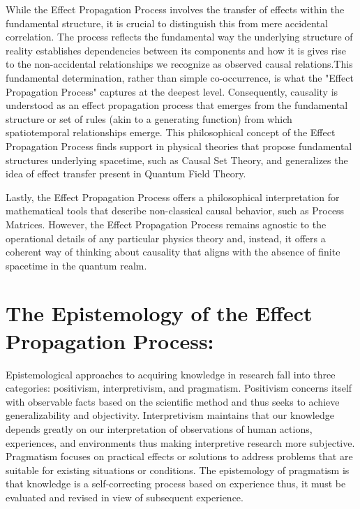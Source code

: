 \documentclass{article}
\begin{document}
While the Effect Propagation Process involves the transfer of effects within the fundamental structure, it is crucial to distinguish this from mere accidental correlation. The process reflects the fundamental way the underlying structure of reality establishes dependencies between its components and how it is gives rise to the non-accidental relationships we recognize as observed causal relations.This fundamental determination, rather than simple co-occurrence, is what the "Effect Propagation Process" captures at the deepest level.\newline
Consequently, causality is understood as an effect propagation process that emerges from the fundamental structure or set of rules (akin to a generating function) from which spatiotemporal relationships emerge. This philosophical concept of the Effect Propagation Process finds support in physical theories that propose fundamental structures underlying spacetime, such as Causal Set Theory, and generalizes the idea of effect transfer present in Quantum Field Theory.

Lastly, the Effect Propagation Process offers a philosophical interpretation for mathematical tools that describe non-classical causal behavior, such as Process Matrices. However, the Effect Propagation Process remains agnostic to the operational details of any particular physics theory and, instead, it offers a coherent way of thinking about causality that aligns with the absence of finite spacetime in the quantum realm.

\section{The Epistemology of the Effect Propagation Process:}
\label{sec:epp_epistemology}

Epistemological approaches to acquiring knowledge in research fall into three categories: positivism, interpretivism, and pragmatism. Positivism concerns itself with observable facts based on the scientific method and thus seeks to achieve generalizability and objectivity. Interpretivism maintains that our knowledge depends greatly on our interpretation of observations of human actions, experiences, and environments thus making interpretive research more subjective. Pragmatism focuses on practical effects or solutions to address problems that are suitable for existing situations or conditions. The epistemology of pragmatism is that knowledge is a self-correcting process based on experience thus, it must be evaluated and revised in view of subsequent experience.
\end{document}
